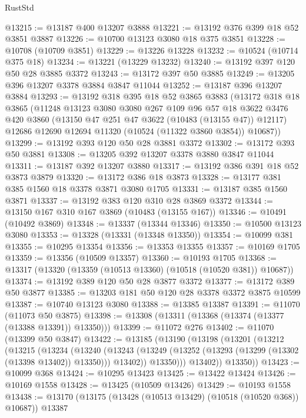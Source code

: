 \begin{lexlean}{RustStd}
\begin{coremodule}
@13215 := @13187 @400 @13207 @3888
@13221 := @13192 @376 @399 @18 @52 @3851 @3887
@13226 := @10700 @13123 @3080 @18 @375 @3851
@13228 := @10708 (@10709 @3851)
@13229 := @13226 @13228
@13232 := @10524 (@10714 @375 @18)
@13234 := @13221 (@13229 @13232)
@13240 := @13192 @397 @120 @50 @28 @3885 @3372
@13243 := @13172 @397 @50 @3885
@13249 := @13205 @396 @13207 @3378 @3884 @3847 @11044
@13252 := @13187 @396 @13207 @3884
@13293 := @13192
    @318
    @395
    @18
    @52
    @3865
    @3883
    (@13172
      @318
      @18
      @3865
      (@11248
        @13123
        @3080
        @3080
        @267
        @109
        @96
        @57
        @18
        @3622
        @3476
        @420
        @3860
        (@13150 @47 @251 @47 @3622 (@10483 (@13155 @47)) @12117)
        @12686
        @12690
        @12694
        @11320
        (@10524 (@11322 @3860 @3854))
        @10687))
@13299 := @13192 @393 @120 @50 @28 @3881 @3372
@13302 := @13172 @393 @50 @3881
@13308 := @13205 @392 @13207 @3378 @3880 @3847 @11044
@13311 := @13187 @392 @13207 @3880
@13317 := @13192 @386 @391 @18 @52 @3873 @3879
@13320 := @13172 @386 @18 @3873
@13328 := @13177 @381 @385 @1560 @18 @3378 @3871 @3080 @1705
@13331 := @13187 @385 @1560 @3871
@13337 := @13192 @383 @120 @310 @28 @3869 @3372
@13344 := @13150 @167 @310 @167 @3869 (@10483 (@13155 @167))
@13346 := @10491 (@10492 @3869)
@13348 := @13337 (@13344 @13346)
@13350 := @10500 @13123 @3080
@13353 := @13328 (@13331 (@13348 @13350))
@13354 := @10099 @381
@13355 := @10295 @13354
@13356 := @13353 @13355
@13357 := @10169 @1705
@13359 := @13356 (@10509 @13357)
@13360 := @10193 @1705
@13368 := @13317 (@13320 (@13359 (@10513 @13360) (@10518 (@10520 @381)) @10687))
@13374 := @13192 @389 @120 @50 @28 @3877 @3372
@13377 := @13172 @389 @50 @3877
@13385 := @13203 @181 @50 @120 @28 @3378 @3372 @3875 @10599
@13387 := @10740 @13123 @3080
@13388 := @13385 @13387
@13391 := @11070 (@11073 @50 @3875)
@13398 := @13308 (@13311 (@13368 (@13374 (@13377 (@13388 @13391)) @13350)))
@13399 := @11072 @276
@13402 := @11070 (@13399 @50 @3847)
@13422 := @13185
    (@13190
      (@13198
        (@13201
          (@13212
            (@13215
              (@13234
                (@13240
                  (@13243
                    (@13249 (@13252 (@13293 (@13299 (@13302 (@13398 @13402)) @13350))) @13402))
                  @13350)))
            @13402))
        @13350))
@13423 := @10099 @368
@13424 := @10295 @13423
@13425 := @13422 @13424
@13426 := @10169 @1558
@13428 := @13425 (@10509 @13426)
@13429 := @10193 @1558
@13438 := @13170 (@13175 (@13428 (@10513 @13429) (@10518 (@10520 @368)) @10687)) @13387

\end{coremodule}
\end{lexlean}
